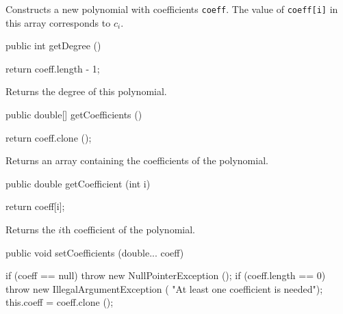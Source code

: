 \begin{tabb}   Constructs a new polynomial with coefficients \texttt{coeff}. The value of
 \texttt{coeff[i]} in this array corresponds to $c_i$.
\end{tabb}
\begin{htmlonly}
\end{htmlonly}
\begin{code}

   public int getDegree ()\begin{hide} {
      return coeff.length - 1;
   }\end{hide}
\end{code}
\begin{tabb}   Returns the degree of this polynomial.
\end{tabb}
\begin{htmlonly}
\end{htmlonly}
\begin{code}

   public double[] getCoefficients ()\begin{hide} {
      return coeff.clone ();
   }\end{hide}
\end{code}
\begin{tabb}   Returns an array containing the coefficients of the polynomial.
\end{tabb}
\begin{htmlonly}
\end{htmlonly}
\begin{code}

   public double getCoefficient (int i)\begin{hide} {
      return coeff[i];
   }\end{hide}
\end{code}
\begin{tabb}   Returns the $i$th coefficient of the polynomial.
\end{tabb}
\begin{htmlonly}
\end{htmlonly}
\begin{code}

   public void setCoefficients (double... coeff)\begin{hide} {
      if (coeff == null)
         throw new NullPointerException ();
      if (coeff.length == 0)
         throw new IllegalArgumentException (
               "At least one coefficient is needed");
      this.coeff = coeff.clone ();
   }\end{hide}
\end{code}
